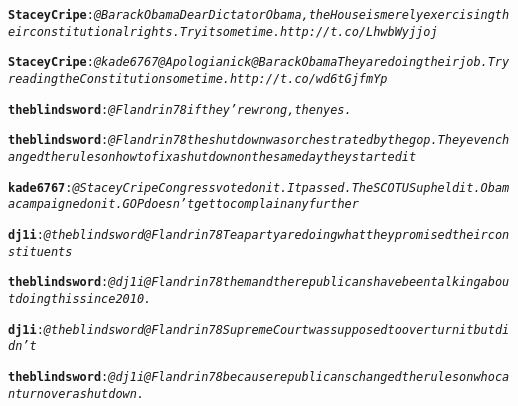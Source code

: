 \begin{alltt}
\textbf{StaceyCripe}: \emph{@BarackObama Dear Dictator Obama, the House is merely exercising their constitutional rights. Try it sometime. http://t.co/LhwbWyjjoj}

\textbf{StaceyCripe}: \emph{@kade6767 @Apologianick @BarackObama They are doing their job. Try reading the Constitution sometime. http://t.co/wd6tGjfmYp}

\textbf{theblindsword}: \emph{@Flandrin78 if they're wrong, then yes.}

\textbf{theblindsword}: \emph{@Flandrin78 the shutdown was orchestrated by the gop. They even changed the rules on how to fix a shutdown on the same day they started it}

\textbf{kade6767}: \emph{@StaceyCripe Congress voted on it. It passed. The SCOTUS upheld it. Obama campaigned on it. GOP doesn't get to complain any further}

\textbf{dj1i}: \emph{@theblindsword @Flandrin78 Tea party are doing what they promised their constituents}

\textbf{theblindsword}: \emph{@dj1i @Flandrin78 them and the republicans have been talking about doing this since 2010.}

\textbf{dj1i}: \emph{@theblindsword @Flandrin78 Supreme Court was supposed to overturn it but didn't}

\textbf{theblindsword}: \emph{@dj1i @Flandrin78 because republicans changed the rules on who can turn over a shutdown.}

\end{alltt}